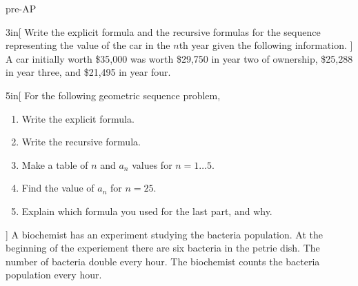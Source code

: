\begin{taggedblock}{pre-AP}

\begin{myWideProblem}{3in}[%
        Write the explicit formula and the recursive formulas 
        for the sequence representing the value of the car in the $n$th year
        given the following information.
    ]
    {
        A car initially worth \$35,000 
        was worth \$29,750 in year two of ownership, 
        \$25,288 in year three,
        and \$21,495 in year four. 
    }
\end{myWideProblem}

\newpage
\begin{myWideProblem}{5in}[%
    For the following geometric sequence problem,
    \begin{enumerate}[nosep]
        \item Write the explicit formula.
        \item Write the recursive formula.
        \item Make a table of $n$ and $a_n$ values for $n=1\dots5$.
        \item Find the value of $a_n$ for $n=25$.
        \item Explain which formula you used for the last part, and why.
    \end{enumerate}
]
{
    A biochemist has an experiment studying the bacteria population. 
    At the beginning of the experiement there are six bacteria in the petrie dish.
    The number of bacteria double every hour.
    The biochemist counts the bacteria population every hour.
}
\end{myWideProblem}

\end{taggedblock}